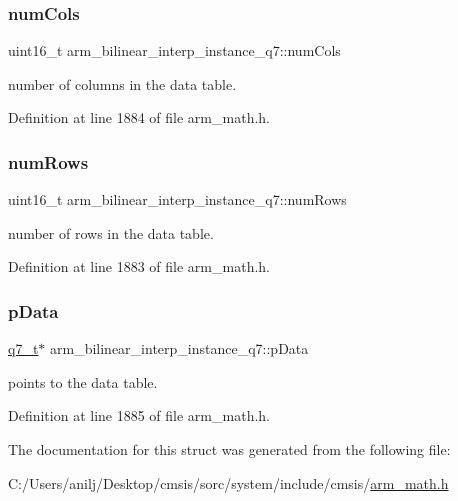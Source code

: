\subsubsection{\texorpdfstring{num\+Cols}{numCols}}
{\footnotesize\ttfamily uint16\+\_\+t arm\+\_\+bilinear\+\_\+interp\+\_\+instance\+\_\+q7\+::num\+Cols}

number of columns in the data table. 

Definition at line 1884 of file arm\+\_\+math.\+h.

\mbox{\label{structarm__bilinear__interp__instance__q7_ad5a8067cab5f9ea4688b11a623e16607}} 
\subsubsection{\texorpdfstring{num\+Rows}{numRows}}
{\footnotesize\ttfamily uint16\+\_\+t arm\+\_\+bilinear\+\_\+interp\+\_\+instance\+\_\+q7\+::num\+Rows}

number of rows in the data table. 

Definition at line 1883 of file arm\+\_\+math.\+h.

\mbox{\label{structarm__bilinear__interp__instance__q7_af05194d691bbefb02c34bafb22ca9ef0}} 
\subsubsection{\texorpdfstring{p\+Data}{pData}}
{\footnotesize\ttfamily \hyperlink{arm__math_8h_ae541b6f232c305361e9b416fc9eed263}{q7\+\_\+t}$\ast$ arm\+\_\+bilinear\+\_\+interp\+\_\+instance\+\_\+q7\+::p\+Data}

points to the data table. 

Definition at line 1885 of file arm\+\_\+math.\+h.



The documentation for this struct was generated from the following file\+:\begin{DoxyCompactItemize}
\item 
C\+:/\+Users/anilj/\+Desktop/cmsis/sorc/system/include/cmsis/\hyperlink{arm__math_8h}{arm\+\_\+math.\+h}\end{DoxyCompactItemize}
